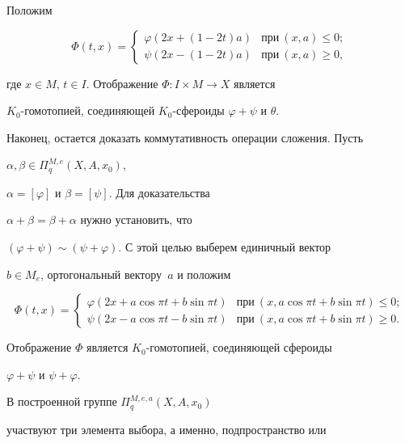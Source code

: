 \begin{pf}
Положим 


$$ 


\Phi(t,x)= 


\begin{cases} 


\varphi(2x+(1-2t)a)&\text{при}\ (x,a)\le0;\\ 


\psi(2x-(1-2t)a)&\text{при}\ (x,a)\ge0, 


\end{cases} 


$$ 


где $x\in M$, $t\in I$. Отображение $\Phi:I\times M\to X$ является 


$K_0$-гомотопией, соединяющей $K_0$-сфероиды $\varphi+\psi$ и $\theta$. 


Наконец, остается доказать коммутативность операции сложения. Пусть 


$\alpha,\beta\in\Pi^{M,e}_q(X,A,x_0)$, 


$\alpha=[\varphi]$ и $\beta=[\psi]$. Для доказательства 


$\alpha+\beta=\beta+\alpha$ нужно установить, что 


$(\varphi+\psi)\sim(\psi+\varphi)$. С этой целью выберем единичный вектор 


$b\in M_e$, ортогональный вектору~$a$ и положим 


$$ 


\Phi(t,x)= 


\begin{cases} 


\varphi(2x+a\cos\pi t+b\sin\pi t)& 


\text{при}\ (x,a\cos\pi t+b\sin\pi t)\le0;\\ 


\psi(2x-a\cos\pi t-b\sin\pi t)& 


\text{при}\ (x,a\cos\pi t+b\sin\pi t)\ge0. 


\end{cases} 


$$ 


Отображение $\Phi$ является $K_0$-гомотопией, соединяющей сфероиды 


$\varphi+\psi$ и $\psi+\varphi$. 


\end{pf} 


 


В построенной группе $\Pi^{M,e,a}_q(X,A,x_0)$ 


участвуют три элемента выбора, а именно, подпространство или 


